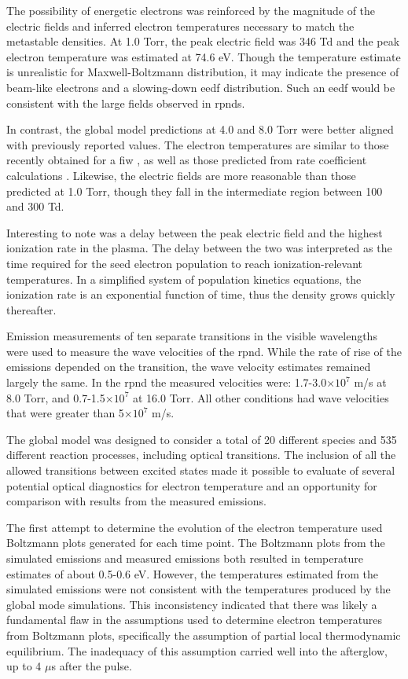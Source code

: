The possibility of energetic electrons was reinforced by the magnitude of the
electric fields and inferred electron temperatures necessary to match the
metastable densities. At 1.0 Torr, the peak electric field was 346 Td and the
peak electron temperature was estimated at 74.6 eV. Though the temperature
estimate is unrealistic for Maxwell-Boltzmann distribution, it may indicate the
presence of beam-like electrons and a slowing-down \acs{eedf} distribution. Such
an \acs{eedf} would be consistent with the large fields observed in \acs{rpnd}s.

In contrast, the global model predictions at 4.0 and 8.0 Torr were better
aligned with previously reported values. The electron temperatures are similar
to those recently obtained for a \acs{fiw} \cite{Takashima2011}, as well as
those predicted from rate coefficient calculations \cite{Aleksandrov2007}.
Likewise, the electric fields are more reasonable than those predicted at 1.0
Torr, though they fall in the intermediate region between 100 and 300 Td.

Interesting to note was a delay between the peak electric field and the highest
ionization rate in the plasma. The delay between the two was interpreted as the
time required for the seed electron population to reach ionization-relevant
temperatures. In a simplified system of population kinetics equations, the
ionization rate is an exponential function of time, thus the density grows
quickly thereafter.

Emission measurements of ten separate transitions in the visible wavelengths
were used to measure the wave velocities of the \acs{rpnd}. While the rate of
rise of the emissions depended on the transition, the wave velocity estimates
remained largely the same. In the \acs{rpnd} the measured velocities were:
1.7-3.0$\times10^7$ m/s at 8.0 Torr, and 0.7-1.5$\times10^7$ at 16.0 Torr. All
other conditions had wave velocities that were greater than 5$\times10^7$ m/s.

The global model was designed to consider a total of 20 different species and
535 different reaction processes, including optical transitions. The inclusion
of all the allowed transitions between excited states made it possible to
evaluate of several potential optical diagnostics for electron temperature and
an opportunity for comparison with results from the measured emissions.

The first attempt to determine the evolution of the electron temperature used
Boltzmann plots generated for each time point. The Boltzmann plots from the
simulated emissions and measured emissions both resulted in temperature
estimates of about 0.5-0.6 eV. However, the temperatures estimated from the
simulated emissions were not consistent with the temperatures produced by the
global mode simulations. This inconsistency indicated that there was likely a
fundamental flaw in the assumptions used to determine electron temperatures from
Boltzmann plots, specifically the assumption of partial local thermodynamic
equilibrium. The inadequacy of this assumption carried well into the afterglow,
up to 4 $\mu$s after the pulse.

